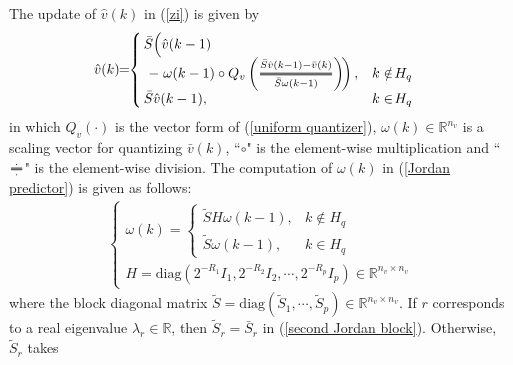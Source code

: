 \documentclass{autart}
\newcommand{\efrac}[2]{%
	\mathchoice
	{\ooalign{%
			$\genfrac{}{}{1.8pt}0{\hphantom{#1}}{\hphantom{#2}}$\cr%
			$\color{white}\genfrac{}{}{.6pt}0{\color{black}#1}{\color{black}#2}$}}%
	{\ooalign{%
			$\genfrac{}{}{1.8pt}1{\hphantom{#1}}{\hphantom{#2}}$\cr%
			$\color{white}\genfrac{}{}{.6pt}1{\color{black}#1}{\color{black}#2}$}}%
	{\ooalign{%
			$\genfrac{}{}{1.8pt}2{\hphantom{#1}}{\hphantom{#2}}$\cr%
			$\color{white}\genfrac{}{}{.6pt}2{\color{black}#1}{\color{black}#2}$}}%
	{\ooalign{%
			$\genfrac{}{}{1.8pt}3{\hphantom{#1}}{\hphantom{#2}}$\cr%
			$\color{white}\genfrac{}{}{.6pt}3{\color{black}#1}{\color{black}#2}$}}%
}
\newcommand{\Efrac}[2]{%
	\mathchoice
	{\ooalign{%
			$\genfrac{}{}{1.8pt}0{#1}{#2}$\cr%
			$\color{white}\genfrac{}{}{.6pt}0{\phantom{#1}}{\phantom{#2}}$}}%
	{\ooalign{%
			$\genfrac{}{}{1.8pt}1{#1}{#2}$\cr%
			$\color{white}\genfrac{}{}{.6pt}1{\phantom{#1}}{\phantom{#2}}$}}%
	{\ooalign{%
			$\genfrac{}{}{1.8pt}2{#1}{#2}$\cr%
			$\color{white}\genfrac{}{}{.6pt}2{\phantom{#1}}{\phantom{#2}}$}}%
	{\ooalign{%
			$\genfrac{}{}{1.8pt}3{#1}{#2}$\cr%
			$\color{white}\genfrac{}{}{.6pt}3{\phantom{#1}}{\phantom{#2}}$}}%
}
\begin{document}
The update of $\hat v(k)$ in (\ref{zi}) is given by 
\begin{align}\label{Jordan predictor}
\!\!\! \hat v  (k)  \!\! = \!\!
 \left\{\!\! \begin{array}{ll} 
\bar S \Big( \hat v (k-1) \\ 
\,\, - \left. \omega (k-1) \circ Q_v\left(\Efrac{\bar S \hat v(k-1)-\bar v(k)}{   \bar S  \omega(k-1)}\right) \!  \right), & k \notin \!H_q \\
\bar S \hat v (k-1),  & k \in \! H_q \\
\end{array}\right. 
\end{align}
in which $Q_v(\cdot)$ is the vector form of (\ref{uniform quantizer}), $\omega(k) \in \mathbb R ^ {n_v} $ is a scaling vector for quantizing $\bar v(k)$, ``$\circ$" is the element-wise multiplication and ``$\efrac{\,\,\cdot\,\,}{\cdot}$" is the element-wise division. 
The computation of $\omega(k)$ in (\ref{Jordan predictor}) is given as follows:
\begin{align} \label{Jordan case J}
\!\! \!\!\!  
\left \{\!\! \begin{array}{l}
\omega(k) =\left \{ \begin{array}{ll}
\tilde {S}H \omega(k-1), & k \notin H_q \\
\tilde S \omega(k-1), & k \in H_q
\end{array}\right.  \\
H \!=\! \text{diag}(2^{-R_1}I_1, 2^{-R_2}I_2, \cdots, 2^{-R_p}I_p)  \!\in \! \mathbb{R}^{n_v \times n_v}
\end{array}\right.
\end{align} 
%
where the block diagonal matrix $\tilde S = \text{diag}(\tilde S_1, \cdots, \tilde S_p) \in \mathbb R ^{n_v \times n_v}$. If $r$ corresponds to a real eigenvalue $\lambda_r \in \mathbb R$, then $\tilde S_r = \bar S_r$ in (\ref{second Jordan block}). Otherwise, $\tilde S_r$ takes
\end{document}
